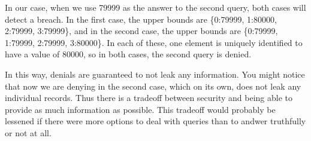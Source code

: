 \documentclass{article}
\begin{document}
In our case, when we use 79999 as the answer to the second query, both cases will detect a breach. In the first case, the upper bounds are \{0:79999, 1:80000, 2:79999, 3:79999\}, and in the second case, the upper bounds are \{0:79999, 1:79999, 2:79999, 3:80000\}. In each of these, one element is uniquely identified to have a value of 80000, so in both cases, the second query is denied.

In this way, denials are guaranteed to not leak any information.
You might notice that now we are denying in the second case, which on its own, does not leak any individual records.
Thus there is a tradeoff between security and being able to provide as much information as possible.
This tradeoff would probably be lessened if there were more options to deal with queries than to andwer truthfully or not at all.

\printbibliography{}
\end{document}
